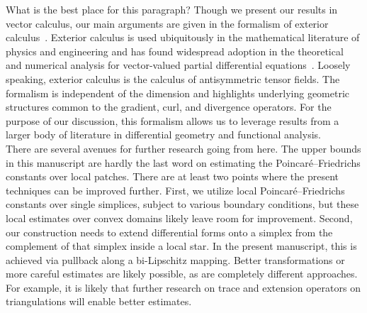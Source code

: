 \documentclass[10pt,letterpaper]{article}
\newcommand{\mwl}[1]{{\color{red}#1}}
\begin{document}
\mwl{What is the best place for this paragraph?}
Though we present our results in vector calculus, our main arguments are given in the formalism of exterior calculus~\cite{greub1967multilinear,lee2012smooth}. Exterior calculus is used ubiquitously in the mathematical literature of physics and engineering and has found widespread adoption in the theoretical and numerical analysis for vector-valued partial differential equations~\cite{hiptmair2002finite,gross2004electromagnetic,arnold2006finite,arnold2009geometric,arnold2010finite,demlow2014posteriori,licht2021local,arnold2021complexes}. Loosely speaking, exterior calculus is the calculus of antisymmetric tensor fields. The formalism is independent of the dimension and highlights underlying geometric structures common to the gradient, curl, and divergence operators.
For the purpose of our discussion, this formalism allows us to leverage results from a larger body of literature in differential geometry and functional analysis. 
\\ 




There are several avenues for further research going from here. 
The upper bounds in this manuscript are hardly the last word on estimating the Poincar\'e--Friedrichs constants over local patches. There are at least two points where the present techniques can be improved further. First, we utilize local Poincar\'e--Friedrichs constants over single simplices, subject to various boundary conditions, but these local estimates over convex domains likely leave room for improvement.
Second, our construction needs to extend differential forms onto a simplex from the complement of that simplex inside a local star. In the present manuscript, this is achieved via pullback along a bi-Lipschitz mapping. 
Better transformations or more careful estimates are likely possible, as are completely different approaches.  For example, it is likely that further research on trace and extension operators on triangulations will enable better estimates.
\end{document}
